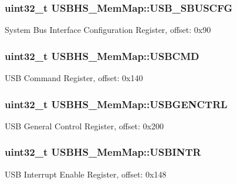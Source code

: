 \subsubsection[{U\+S\+B\+\_\+\+S\+B\+U\+S\+C\+F\+G}]{\setlength{\rightskip}{0pt plus 5cm}uint32\+\_\+t U\+S\+B\+H\+S\+\_\+\+Mem\+Map\+::\+U\+S\+B\+\_\+\+S\+B\+U\+S\+C\+F\+G}\label{struct_u_s_b_h_s___mem_map_a17e03138a07af56c6f742f0140fff491}
System Bus Interface Configuration Register, offset\+: 0x90 \hypertarget{struct_u_s_b_h_s___mem_map_acdfe9bbb777051ac2acb45a518f431ca}{}
\subsubsection[{U\+S\+B\+C\+M\+D}]{\setlength{\rightskip}{0pt plus 5cm}uint32\+\_\+t U\+S\+B\+H\+S\+\_\+\+Mem\+Map\+::\+U\+S\+B\+C\+M\+D}\label{struct_u_s_b_h_s___mem_map_acdfe9bbb777051ac2acb45a518f431ca}
U\+S\+B Command Register, offset\+: 0x140 \hypertarget{struct_u_s_b_h_s___mem_map_ae42001e4a7aa4fcd7721a0ee4c4fe3f5}{}
\subsubsection[{U\+S\+B\+G\+E\+N\+C\+T\+R\+L}]{\setlength{\rightskip}{0pt plus 5cm}uint32\+\_\+t U\+S\+B\+H\+S\+\_\+\+Mem\+Map\+::\+U\+S\+B\+G\+E\+N\+C\+T\+R\+L}\label{struct_u_s_b_h_s___mem_map_ae42001e4a7aa4fcd7721a0ee4c4fe3f5}
U\+S\+B General Control Register, offset\+: 0x200 \hypertarget{struct_u_s_b_h_s___mem_map_a60f0b13c9094057219dc6cbddd5e9f4a}{}
\subsubsection[{U\+S\+B\+I\+N\+T\+R}]{\setlength{\rightskip}{0pt plus 5cm}uint32\+\_\+t U\+S\+B\+H\+S\+\_\+\+Mem\+Map\+::\+U\+S\+B\+I\+N\+T\+R}\label{struct_u_s_b_h_s___mem_map_a60f0b13c9094057219dc6cbddd5e9f4a}
U\+S\+B Interrupt Enable Register, offset\+: 0x148 \hypertarget{struct_u_s_b_h_s___mem_map_afe4ec3963906653c83890dea008fac84}{}
